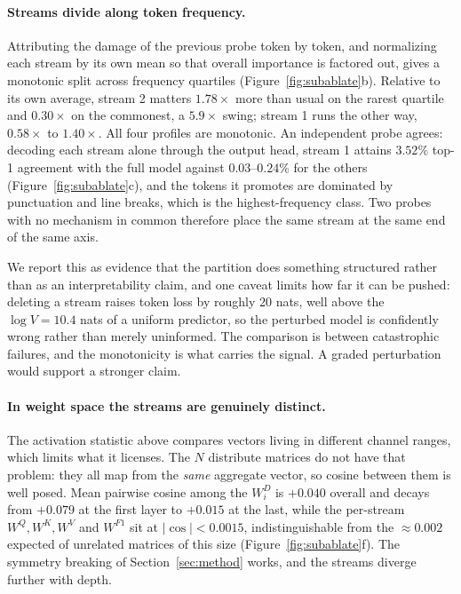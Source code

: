 \documentclass{article}
\newcommand{\nsub}{N}
\begin{document}
\paragraph{Streams divide along token frequency.} Attributing the damage of the
previous probe token by token, and normalizing each stream by its own mean so
that overall importance is factored out, gives a monotonic split across frequency
quartiles (Figure~\ref{fig:subablate}b). Relative to its own average, stream 2
matters $1.78\times$ more than usual on the rarest quartile and $0.30\times$ on
the commonest, a $5.9\times$ swing; stream 1 runs the other way, $0.58\times$ to
$1.40\times$. All four profiles are monotonic. An independent probe agrees:
decoding each stream alone through the output head, stream 1 attains $3.52\%$
top-1 agreement with the full model against $0.03$--$0.24\%$ for the others
(Figure~\ref{fig:subablate}c), and the tokens it promotes are dominated by
punctuation and line breaks, which is the highest-frequency class. Two probes
with no mechanism in common therefore place the same stream at the same end of
the same axis.

We report this as evidence that the partition does something structured rather
than as an interpretability claim, and one caveat limits how far it can be
pushed: deleting a stream raises token loss by roughly 20 nats, well above the
$\log V = 10.4$ nats of a uniform predictor, so the perturbed model is
confidently wrong rather than merely uninformed. The comparison is between
catastrophic failures, and the monotonicity is what carries the signal. A graded
perturbation would support a stronger claim.

\paragraph{In weight space the streams are genuinely distinct.} The activation
statistic above compares vectors living in different channel ranges, which limits
what it licenses. The $\nsub$ distribute matrices do not have that problem: they
all map from the \emph{same} aggregate vector, so cosine between them is well
posed. Mean pairwise cosine among the $W^{D}_i$ is $+0.040$ overall and decays
from $+0.079$ at the first layer to $+0.015$ at the last, while the per-stream
$W^{Q}, W^{K}, W^{V}$ and $W^{F1}$ sit at $|\cos| < 0.0015$, indistinguishable
from the $\approx 0.002$ expected of unrelated matrices of this size
(Figure~\ref{fig:subablate}f). The symmetry breaking of
Section~\ref{sec:method} works, and the streams diverge further with depth.
\end{document}

